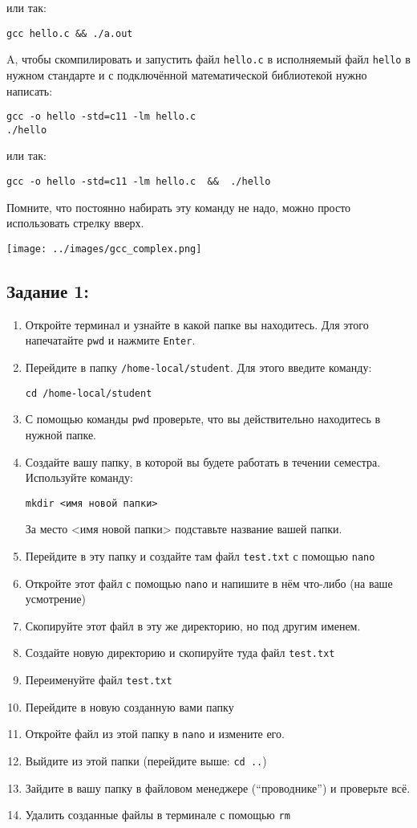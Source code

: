 \documentclass{article}
\begin{document}
или так:
\begin{verbatim}
gcc hello.c && ./a.out
\end{verbatim}
A, чтобы скомпилировать и запустить файл \texttt{hello.c} в исполняемый файл \texttt{hello} в нужном стандарте и с подключённой математической библиотекой нужно написать:
\begin{verbatim}
gcc -o hello -std=c11 -lm hello.c
./hello
\end{verbatim}
или так:
\begin{verbatim}
gcc -o hello -std=c11 -lm hello.c  &&  ./hello
\end{verbatim}
Помните, что постоянно набирать эту команду не надо, можно просто использовать стрелку вверх.
\begin{center}
\texttt{[image: ../images/gcc\_complex.png]}
\end{center}


\subsection*{Задание 1:}
\begin{enumerate}
\item Откройте терминал и узнайте в какой папке вы находитесь. Для этого напечатайте \texttt{pwd} и нажмите \texttt{Enter}.
\item Перейдите в папку  \texttt{/home-local/student}. Для этого введите команду:
\begin{verbatim}
cd /home-local/student
\end{verbatim}
\item С помощью команды \texttt{pwd} проверьте, что вы действительно находитесь в нужной папке.
\item Создайте вашу папку, в которой вы будете работать в течении семестра. Используйте команду:
\begin{verbatim}
mkdir <имя новой папки> 
\end{verbatim}
За место <имя новой папки>  подставьте название вашей папки.
\item Перейдите в эту папку и создайте там файл \texttt{test.txt} с помощью \texttt{nano}
\item Откройте этот файл с помощью \texttt{nano} и напишите в нём что-либо (на ваше усмотрение)
\item Скопируйте этот файл в эту же директорию, но под другим именем.
\item Создайте новую директорию и скопируйте туда файл \texttt{test.txt}
\item Переименуйте файл \texttt{test.txt}
\item Перейдите в новую созданную вами папку
\item Откройте файл из этой папку в \texttt{nano} и измените его.
\item Выйдите из этой папки (перейдите выше:  \texttt{cd ..})
\item Зайдите в вашу папку в файловом менеджере (``проводнике'') и проверьте всё.
\item Удалить созданные файлы в терминале с помощью \texttt{rm}
\end{enumerate}
\end{document}
